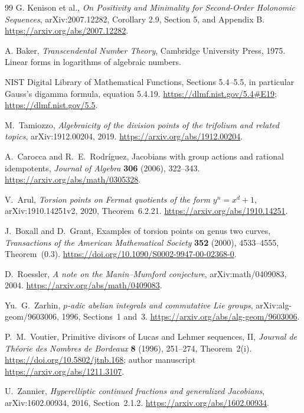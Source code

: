\documentclass[11pt,a4paper]{article}
\theoremstyle{definition}
\theoremstyle{remark}
\numberwithin{equation}{section}
\begin{document}
\begin{thebibliography}{99}
G. Kenison et al., \emph{On Positivity and Minimality for Second-Order
Holonomic Sequences}, arXiv:2007.12282, Corollary 2.9, Section 5, and
Appendix B. \url{https://arxiv.org/abs/2007.12282}.

A. Baker, \emph{Transcendental Number Theory}, Cambridge University Press,
1975. Linear forms in logarithms of algebraic numbers.

NIST Digital Library of Mathematical Functions, Sections 5.4--5.5,
in particular Gauss's digamma formula, equation 5.4.19.
\url{https://dlmf.nist.gov/5.4#E19}; \url{https://dlmf.nist.gov/5.5}.

M.~Tamiozzo, \emph{Algebraicity of the division points of the trifolium
and related topics}, arXiv:1912.00204, 2019.
\url{https://arxiv.org/abs/1912.00204}.

A.~Carocca and R.~E.~Rodr\'iguez, Jacobians with group actions and rational
idempotents, \emph{Journal of Algebra} \textbf{306} (2006), 322--343.
\url{https://arxiv.org/abs/math/0305328}.

V.~Arul, \emph{Torsion points on Fermat quotients of the form
$y^n=x^d+1$}, arXiv:1910.14251v2, 2020, Theorem~6.2.21.
\url{https://arxiv.org/abs/1910.14251}.

J.~Boxall and D.~Grant, Examples of torsion points on genus two curves,
\emph{Transactions of the American Mathematical Society} \textbf{352}
(2000), 4533--4555, Theorem~(0.3).
\url{https://doi.org/10.1090/S0002-9947-00-02368-0}.

D.~Roessler, \emph{A note on the Manin--Mumford conjecture},
arXiv:math/0409083, 2004.
\url{https://arxiv.org/abs/math/0409083}.

Yu.~G.~Zarhin, \emph{$p$-adic abelian integrals and commutative Lie groups},
arXiv:alg-geom/9603006, 1996, Sections~1 and~3.
\url{https://arxiv.org/abs/alg-geom/9603006}.

P.~M.~Voutier, Primitive divisors of Lucas and Lehmer sequences, II,
\emph{Journal de Th\'eorie des Nombres de Bordeaux} \textbf{8} (1996),
251--274, Theorem~2(i).
\url{https://doi.org/10.5802/jtnb.168}; author manuscript
\url{https://arxiv.org/abs/1211.3107}.

U.~Zannier, \emph{Hyperelliptic continued fractions and generalized
Jacobians}, arXiv:1602.00934, 2016, Section~2.1.2.
\url{https://arxiv.org/abs/1602.00934}.


\end{thebibliography}
\end{document}
